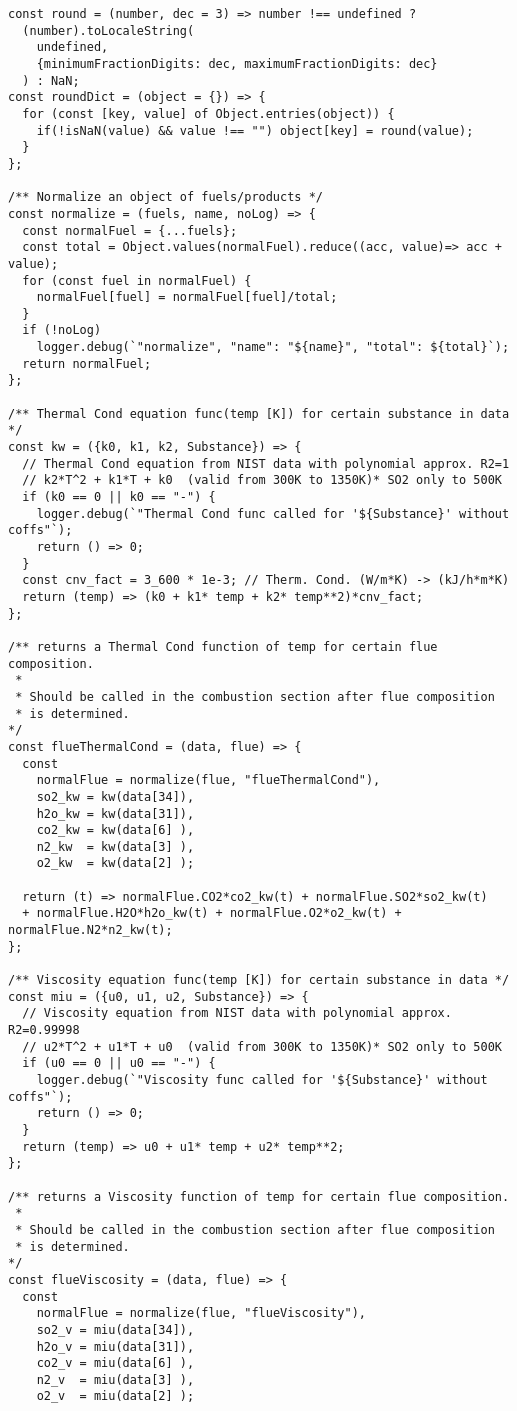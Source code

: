 \begin{verbatim}
const round = (number, dec = 3) => number !== undefined ? 
  (number).toLocaleString(
    undefined,
    {minimumFractionDigits: dec, maximumFractionDigits: dec}
  ) : NaN;
const roundDict = (object = {}) => {
  for (const [key, value] of Object.entries(object)) {
    if(!isNaN(value) && value !== "") object[key] = round(value);
  }
};

/** Normalize an object of fuels/products */
const normalize = (fuels, name, noLog) => {
  const normalFuel = {...fuels};
  const total = Object.values(normalFuel).reduce((acc, value)=> acc + value);
  for (const fuel in normalFuel) {
    normalFuel[fuel] = normalFuel[fuel]/total;
  }
  if (!noLog) 
    logger.debug(`"normalize", "name": "${name}", "total": ${total}`);
  return normalFuel;
};

/** Thermal Cond equation func(temp [K]) for certain substance in data */
const kw = ({k0, k1, k2, Substance}) => {
  // Thermal Cond equation from NIST data with polynomial approx. R2=1
  // k2*T^2 + k1*T + k0  (valid from 300K to 1350K)* SO2 only to 500K
  if (k0 == 0 || k0 == "-") {
    logger.debug(`"Thermal Cond func called for '${Substance}' without coffs"`);
    return () => 0;
  }
  const cnv_fact = 3_600 * 1e-3; // Therm. Cond. (W/m*K) -> (kJ/h*m*K)
  return (temp) => (k0 + k1* temp + k2* temp**2)*cnv_fact;
};

/** returns a Thermal Cond function of temp for certain flue composition.
 * 
 * Should be called in the combustion section after flue composition 
 * is determined.
*/
const flueThermalCond = (data, flue) => {
  const 
    normalFlue = normalize(flue, "flueThermalCond"),
    so2_kw = kw(data[34]),
    h2o_kw = kw(data[31]),
    co2_kw = kw(data[6] ),
    n2_kw  = kw(data[3] ),
    o2_kw  = kw(data[2] );

  return (t) => normalFlue.CO2*co2_kw(t) + normalFlue.SO2*so2_kw(t)
  + normalFlue.H2O*h2o_kw(t) + normalFlue.O2*o2_kw(t) + normalFlue.N2*n2_kw(t);
};

/** Viscosity equation func(temp [K]) for certain substance in data */
const miu = ({u0, u1, u2, Substance}) => {
  // Viscosity equation from NIST data with polynomial approx. R2=0.99998
  // u2*T^2 + u1*T + u0  (valid from 300K to 1350K)* SO2 only to 500K
  if (u0 == 0 || u0 == "-") {
    logger.debug(`"Viscosity func called for '${Substance}' without coffs"`);
    return () => 0;
  }
  return (temp) => u0 + u1* temp + u2* temp**2;
};

/** returns a Viscosity function of temp for certain flue composition.
 * 
 * Should be called in the combustion section after flue composition 
 * is determined.
*/
const flueViscosity = (data, flue) => {
  const 
    normalFlue = normalize(flue, "flueViscosity"),
    so2_v = miu(data[34]),
    h2o_v = miu(data[31]),
    co2_v = miu(data[6] ),
    n2_v  = miu(data[3] ),
    o2_v  = miu(data[2] );


\end{verbatim}
